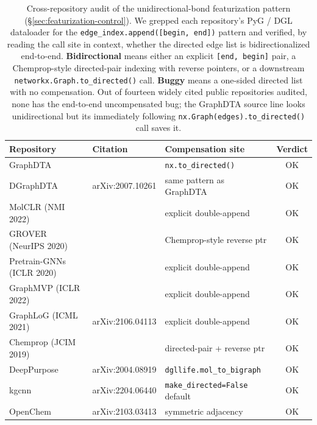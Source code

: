
\begin{table}[t]
\centering
\caption{Cross-repository audit of the unidirectional-bond featurization
pattern (\S\ref{sec:featurization-control}). We grepped each repository's
PyG / DGL dataloader for the
\texttt{edge\_index.append([begin,\,end])} pattern and verified, by
reading the call site in context, whether the directed edge list is
bidirectionalized end-to-end. \textbf{Bidirectional} means either an
explicit \texttt{[end,\,begin]} pair, a Chemprop-style directed-pair
indexing with reverse pointers, or a downstream
\texttt{networkx.Graph.to\_directed()} call. \textbf{Buggy} means a
one-sided directed list with no compensation. Out of fourteen widely
cited public repositories audited, none has the end-to-end uncompensated
bug; the GraphDTA source line looks unidirectional but its immediately
following \texttt{nx.Graph(edges).to\_directed()} call saves it.}
\label{tab:repo_audit}
\small
\begin{tabular}{lllc}
\toprule
Repository & Citation & Compensation site & Verdict \\
\midrule
GraphDTA & \cite{nguyen2021graphdta} & \texttt{nx.to\_directed()} & OK \\
DGraphDTA & arXiv:2007.10261 & same pattern as GraphDTA & OK \\
MolCLR (NMI 2022) & \cite{wang2022molclr} & explicit double-append & OK \\
GROVER (NeurIPS 2020) & \cite{rong2020grover} & Chemprop-style reverse ptr & OK \\
Pretrain-GNNs (ICLR 2020) & \cite{hu2020pretrain} & explicit double-append & OK \\
GraphMVP (ICLR 2022) & \cite{liu2022graphmvp} & explicit double-append & OK \\
GraphLoG (ICML 2021) & arXiv:2106.04113 & explicit double-append & OK \\
Chemprop (JCIM 2019) & \cite{yang2019chemprop} & directed-pair + reverse ptr & OK \\
DeepPurpose & arXiv:2004.08919 & \texttt{dgllife.mol\_to\_bigraph} & OK \\
kgcnn & arXiv:2204.06440 & \texttt{make\_directed=False} default & OK \\
OpenChem & arXiv:2103.03413 & symmetric adjacency & OK \\

\end{tabular}
\end{table}
